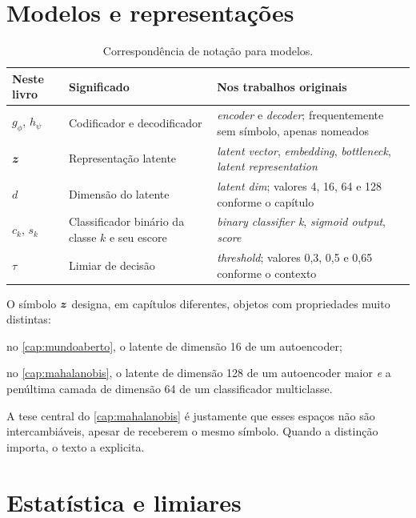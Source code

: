 \section{Modelos e representações}

\begin{table}[htbp]
\centering
\caption{Correspondência de notação para modelos.}
\label{tab:notb-modelos}
\small
\begin{tabular}{p{2.3cm}p{4.6cm}p{5.4cm}}
\toprule
\textbf{Neste livro} & \textbf{Significado} & \textbf{Nos trabalhos originais} \\
\midrule
$g_{\phi}$, $h_{\psi}$ &
Codificador e decodificador &
\emph{encoder} e \emph{decoder}; frequentemente sem símbolo, apenas nomeados \\
\addlinespace
$\bm{z}$ &
Representação latente &
\emph{latent vector}, \emph{embedding}, \emph{bottleneck}, \emph{latent
representation} \\
\addlinespace
$d$ &
Dimensão do latente &
\emph{latent dim}; valores 4, 16, 64 e 128 conforme o capítulo \\
\addlinespace
$c_k$, $s_k$ &
Classificador binário da classe $k$ e seu escore &
\emph{binary classifier k}, \emph{sigmoid output}, \emph{score} \\
\addlinespace
$\tau$ &
Limiar de decisão &
\emph{threshold}; valores 0,3, 0,5 e 0,65 conforme o contexto \\
\bottomrule
\end{tabular}
\end{table}

\begin{destaque}
O símbolo $\bm{z}$ designa, em capítulos diferentes, objetos com propriedades muito
distintas:

no \cref{cap:mundoaberto}, o latente de dimensão 16 de um autoencoder;

no \cref{cap:mahalanobis}, o latente de dimensão 128 de um autoencoder maior \emph{e} a
penúltima camada de dimensão 64 de um classificador multiclasse.

A tese central do \cref{cap:mahalanobis} é justamente que esses espaços não são
intercambiáveis, apesar de receberem o mesmo símbolo. Quando a distinção importa, o texto
a explicita.
\end{destaque}

\section{Estatística e limiares}

